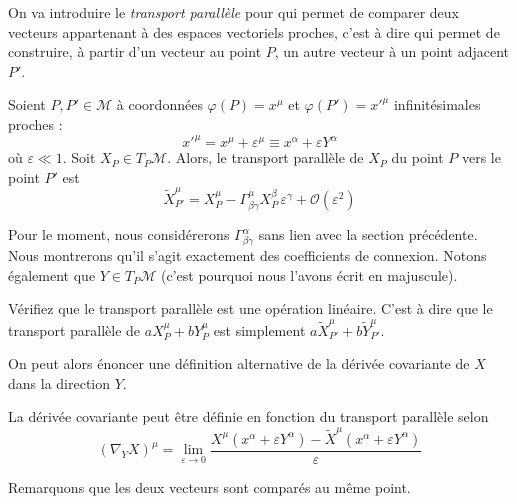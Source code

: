 On va introduire le \textit{transport parallèle} pour qui permet de comparer deux vecteurs appartenant à des espaces vectoriels proches, c'est à dire qui permet de construire, à partir d'un vecteur au point $P$, un autre vecteur à un point adjacent $P'$.
\begin{theoremframe}
    \begin{defi}
        Soient $P, P' \in \mathcal{M}$ à coordonnées $\varphi(P) = x^\mu$ et $\varphi (P') = x'^\mu$ infinitésimales proches :
        \begin{equation}
            x'^\mu = x^\mu + \varepsilon^\mu \equiv x^{\alpha} + \varepsilon Y^{\alpha} 
        \end{equation}
        où $\varepsilon \ll 1$. Soit $X_P \in T_P\mathcal{M}$. Alors, le transport parallèle de $X_P$ du point $P$ vers le point $P'$ est
        \begin{equation}
            \boxed{\tilde{X}^{\mu}_{P'} = X^{\mu}_{P} - \Gamma^{\mu}_{\beta \gamma}X^{\beta}_{P} \, \varepsilon^{\gamma} + \mathcal{O}(\varepsilon^2)}
        \end{equation}
    \end{defi}
\end{theoremframe}
Pour le moment, nous considérerons $\Gamma^{\alpha}_{\beta \gamma}$ sans lien avec la section précédente. Nous montrerons qu'il s'agit exactement des coefficients de connexion. Notons également que $Y\in T_P\mathcal{M}$ (c'est pourquoi nous l'avons écrit en majuscule).
\begin{exerc}
    Vérifiez que le transport parallèle est une opération linéaire. C'est à dire que le transport parallèle de $a X^\mu_P +b Y^\mu_P$ est simplement $a\tilde{X}^\mu_{P'}+ b\tilde{Y}^\mu_{P'}$.
\end{exerc}
On peut alors énoncer une définition alternative de la dérivée covariante de $X$ dans la direction $Y$.
\begin{theoremframe}
\begin{propri}
\label{def2:transport parallèle}
    La dérivée covariante peut être définie en fonction du transport parallèle selon
    \begin{equation}
        (\nabla_{Y}X)^{\mu} = \lim_{\varepsilon \rightarrow 0}\frac{X^{\mu}(x^{\alpha} + \varepsilon Y^{\alpha} ) - \tilde{X}^{\mu}(x^{\alpha} +\varepsilon Y^{\alpha} )}{\varepsilon}
    \end{equation}
\end{propri}
\end{theoremframe}
Remarquons que les deux vecteurs sont comparés au même point.
